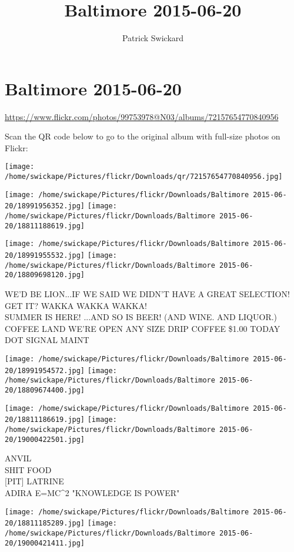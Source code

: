 \documentclass[10pt,letterpaper]{article}
\title{Baltimore 2015-06-20}
\author{Patrick Swickard}
\date{}
\begin{document}
\section*{Baltimore 2015-06-20}

\url{https://www.flickr.com/photos/99753978@N03/albums/72157654770840956}

Scan the QR code below to go to the original album with full-size photos on Flickr:

\texttt{[image: /home/swickape/Pictures/flickr/Downloads/qr/72157654770840956.jpg]}
\pagebreak

\texttt{[image: /home/swickape/Pictures/flickr/Downloads/Baltimore 2015-06-20/18991956352.jpg]}
\texttt{[image: /home/swickape/Pictures/flickr/Downloads/Baltimore 2015-06-20/18811188619.jpg]}

\texttt{[image: /home/swickape/Pictures/flickr/Downloads/Baltimore 2015-06-20/18991955532.jpg]}
\texttt{[image: /home/swickape/Pictures/flickr/Downloads/Baltimore 2015-06-20/18809698120.jpg]}

WE'D BE LION...IF WE SAID WE DIDN'T HAVE A GREAT SELECTION!  GET IT?  WAKKA WAKKA WAKKA!\\
SUMMER IS HERE!  ...AND SO IS BEER!  (AND WINE.  AND LIQUOR.)\\
COFFEE LAND WE'RE OPEN ANY SIZE DRIP COFFEE \$1.00 TODAY\\
DOT SIGNAL MAINT
\pagebreak

\texttt{[image: /home/swickape/Pictures/flickr/Downloads/Baltimore 2015-06-20/18991954572.jpg]}
\texttt{[image: /home/swickape/Pictures/flickr/Downloads/Baltimore 2015-06-20/18809674400.jpg]}

\texttt{[image: /home/swickape/Pictures/flickr/Downloads/Baltimore 2015-06-20/18811186619.jpg]}
\texttt{[image: /home/swickape/Pictures/flickr/Downloads/Baltimore 2015-06-20/19000422501.jpg]}

ANVIL\\
SHIT FOOD\\
{[}PIT{]} LATRINE\\
ADIRA E=MC\^{}2 "KNOWLEDGE IS POWER"
\pagebreak

\texttt{[image: /home/swickape/Pictures/flickr/Downloads/Baltimore 2015-06-20/18811185289.jpg]}
\texttt{[image: /home/swickape/Pictures/flickr/Downloads/Baltimore 2015-06-20/19000421411.jpg]}
\end{document}

